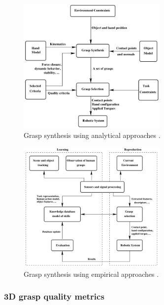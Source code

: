 \documentclass[12pt]{article}
\begin{document}
    \begin{figure}[H]
        \centering
        \includegraphics[width=0.65\textwidth]{sahbani12-analytic_grasp_strategy}
        \caption{Grasp synthesis using analytical approaches \cite{Sahbani2012}.}
        \label{fig:analytic_grasp}
    \end{figure}

    \begin{figure}[H]
        \centering
        \includegraphics[width=0.65\textwidth]{sahbani12-empirical_grasp_strategy}
        \caption{Grasp synthesis using empirical approaches \cite{Sahbani2012}.}
        \label{fig:empirical_grasp}
    \end{figure}

    \subsubsection{3D grasp quality metrics}
\end{document}
